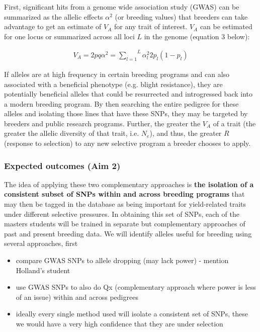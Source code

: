 \documentclass[12pt]{article}
\begin{document}
First, significant hits from a genome wide association study (GWAS)  can be summarized as the allelic effects $\alpha^{2}$ (or breeding values) that breeders can take advantage to get an estimate of $V_{A}$ for any trait of interest. $V_{A}$ can be estimated for one locus or summarized across all loci $L$ in the genome (equation 3 below):

  \begin{align}
    V_A = 2pq\alpha^2
     = \overset{L}{\underset{l=1}{\sum}}\alpha^2_l2p_l(1-p_l)
  \end{align}

If alleles are at high frequency in certain breeding programs and can also associated with a beneficial phenotype (e.g. blight resistance), they are potentially beneficial alleles that could be resurrected and introgressed back into a modern breeding program. 
By then searching the entire pedigree for these alleles and isolating those lines that have these SNPs, they may be targeted by breeders and public research programs.
Further, the greater the $V_A$ of a trait (the greater the allelic diversity of that trait, i.e. $N_{e}$), and thus, the greater $R$ (response to selection) to any new selective program a breeder chooses to apply.


\subsubsection*{Expected outcomes (Aim 2)}

The idea of applying these two complementary approaches is \textbf{the isolation of a consistent subset of SNPs within and across breeding programs} that may then be tagged in the database as being important for yield-related traits under different selective pressures.
In obtaining this set of SNPs, each of the masters students will be trained in separate but complementary approaches of past and present breeding data.
We will identify alleles useful for breeding using several approaches, first
\begin{itemize}
	\item compare GWAS SNPs to allele dropping (may lack power) - mention Holland's student
	\item use GWAS SNPs to also do Qx (complementary approach where power is less of an issue) within and across pedigrees
	\item ideally every single method used will isolate a consistent set of SNPs, these we would have a very high confidence that they are under selection
\end{itemize}
\end{document}
